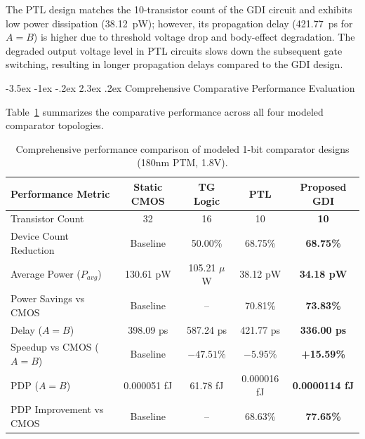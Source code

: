 \documentclass[12pt,a4paper,oneside]{report}
\makeatletter
\renewcommand\section{\@startsection {section}{1}{\z@}%
                                   {-3.5ex \@plus -1ex \@minus -.2ex}%
                                   {2.3ex \@plus.2ex}%
                                   {\normalfont\normalsize\bfseries}}
\makeatother
\begin{document}
The PTL design matches the 10-transistor count of the GDI circuit and exhibits low power dissipation (38.12~pW); however, its propagation delay (421.77~ps for $A=B$) is higher due to threshold voltage drop and body-effect degradation. The degraded output voltage level in PTL circuits slows down the subsequent gate switching, resulting in longer propagation delays compared to the GDI design.

\section{Comprehensive Comparative Performance Evaluation}

Table~\ref{tab:res_overall_comp} summarizes the comparative performance across all four modeled comparator topologies.

\begin{table}[H]
\centering
\caption{Comprehensive performance comparison of modeled 1-bit comparator designs (180nm PTM, 1.8V).}
\label{tab:res_overall_comp}
\vspace{0.2cm}
\begin{tabular}{|l|c|c|c|c|}
\hline
\textbf{Performance Metric} & \textbf{Static CMOS} & \textbf{TG Logic} & \textbf{PTL} & \textbf{Proposed GDI} \\
\hline
Transistor Count & 32 & 16 & 10 & \textbf{10} \\
\hline
Device Count Reduction & Baseline & 50.00\% & 68.75\% & \textbf{68.75\%} \\
\hline
Average Power ($P_{avg}$) & 130.61 pW & 105.21 $\mu$W & 38.12 pW & \textbf{34.18 pW} \\
\hline
Power Savings vs CMOS & Baseline & -- & 70.81\% & \textbf{73.83\%} \\
\hline
Delay ($A=B$) & 398.09 ps & 587.24 ps & 421.77 ps & \textbf{336.00 ps} \\
\hline
Speedup vs CMOS ($A=B$) & Baseline & $-47.51\%$ & $-5.95\%$ & \textbf{+15.59\%} \\
\hline
PDP ($A=B$) & 0.000051 fJ & 61.78 fJ & 0.000016 fJ & \textbf{0.0000114 fJ} \\
\hline
PDP Improvement vs CMOS & Baseline & -- & 68.63\% & \textbf{77.65\%} \\
\hline
\end{tabular}
\end{table}
\end{document}

